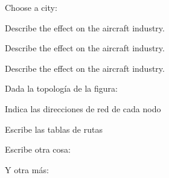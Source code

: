 \documentclass[english]{arco-exam}
\begin{document}
\begin{questions}
\begin{multiQuestion}[12]
    \begin{parts}
    \subQuestion[] \begin{questionBlock}
      Choose a city:

    \end{questionBlock}

    \subQuestion[] \begin{questionBlock}
      Describe the effect on the aircraft industry.

    \end{questionBlock}

    \subQuestion[] \begin{questionBlock}
      Describe the effect on the aircraft industry.

    \end{questionBlock}

    \subQuestion[] \begin{questionBlock}
      Describe the effect on the aircraft industry.

    \end{questionBlock}

    \end{parts}
  \end{multiQuestion}

  \begin{multiQuestion}[4]
    Dada la topología de la figura:

    \begin{parts}
      \subQuestion
      Indica las direcciones de red de cada nodo


      \subQuestion[1]
      Escribe las tablas de rutas


      \subQuestion
      Escribe otra cosa:


      \subQuestion
      Y otra más:

    \end{parts}


\end{multiQuestion}
\end{questions}
\end{document}

